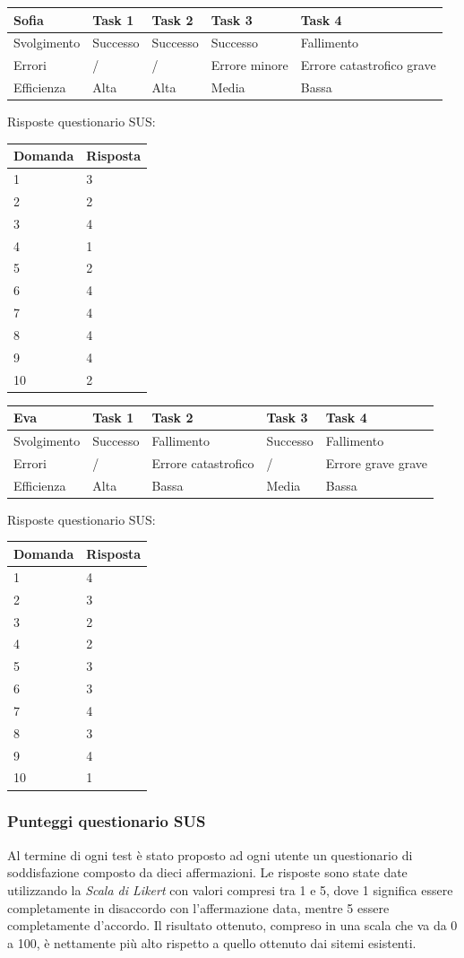 \documentclass[12pt,italian,]{report}
\begin{document}
\begin{longtable}[]{@{}lllll@{}}
\toprule
Sofia & Task 1 & Task 2 & Task 3 & Task 4\tabularnewline
\midrule
\endhead
Svolgimento & Successo & Successo & Successo & Fallimento\tabularnewline
Errori & / & / & Errore minore & Errore catastrofico
grave\tabularnewline
Efficienza & Alta & Alta & Media & Bassa\tabularnewline
\bottomrule
\end{longtable}

Risposte questionario SUS:

\begin{longtable}[]{@{}ll@{}}
\toprule
Domanda & Risposta\tabularnewline
\midrule
\endhead
1 & 3\tabularnewline
2 & 2\tabularnewline
3 & 4\tabularnewline
4 & 1\tabularnewline
5 & 2\tabularnewline
6 & 4\tabularnewline
7 & 4\tabularnewline
8 & 4\tabularnewline
9 & 4\tabularnewline
10 & 2\tabularnewline
\bottomrule
\end{longtable}

\begin{longtable}[]{@{}lllll@{}}
\toprule
Eva & Task 1 & Task 2 & Task 3 & Task 4\tabularnewline
\midrule
\endhead
Svolgimento & Successo & Fallimento & Successo & Fallimento\tabularnewline
Errori & / & Errore catastrofico & / & Errore grave
grave\tabularnewline
Efficienza & Alta & Bassa & Media & Bassa\tabularnewline
\bottomrule
\end{longtable}

Risposte questionario SUS:

\begin{longtable}[]{@{}ll@{}}
\toprule
Domanda & Risposta\tabularnewline
\midrule
\endhead
1 & 4\tabularnewline
2 & 3\tabularnewline
3 & 2\tabularnewline
4 & 2\tabularnewline
5 & 3\tabularnewline
6 & 3\tabularnewline
7 & 4\tabularnewline
8 & 3\tabularnewline
9 & 4\tabularnewline
10 & 1\tabularnewline
\bottomrule
\end{longtable}

\subsubsection{Punteggi questionario SUS}\label{punteggi-SUS}

Al termine di ogni test è stato proposto ad ogni utente un questionario
di soddisfazione composto da dieci affermazioni. Le risposte sono state
date utilizzando la \emph{Scala di Likert} con valori compresi tra 1 e
5, dove 1 significa essere completamente in disaccordo con
l'affermazione data, mentre 5 essere completamente d'accordo. Il
risultato ottenuto, compreso in una scala che va da 0 a 100, è
nettamente più alto rispetto a quello ottenuto dai sitemi esistenti.
\end{document}
